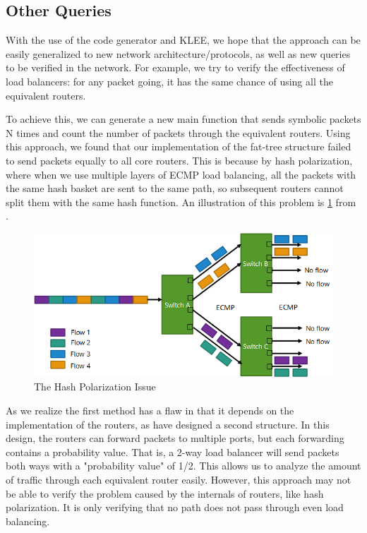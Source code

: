 \documentclass[letterpaper, 10 pt, conference]{ieeeconf}  %
\begin{document}
\subsection{Other Queries}

With the use of the code generator and KLEE, we hope that the approach can be easily generalized to new network architecture/protocols, as well as new queries to be verified in the network. 
For example, we try to verify the effectiveness of load balancers: for any packet going, it has the same chance of using all the equivalent routers. 

To achieve this, we can generate a new main function that sends symbolic packets N times and count the number of packets through the equivalent routers. 
Using this approach, we found that our implementation of the fat-tree structure failed to send packets equally to all core routers. 
This is because by hash polarization, where when we use multiple layers of ECMP load balancing, all the packets with the same hash basket are sent to the same path, so subsequent routers cannot split them with the same hash function. 
An illustration of this problem is \ref{fig:hash_polar} from \cite{huawei-hash}.

\begin{figure}[]
  \centering
  \includegraphics[width=\linewidth]{hash-polar.png}
  \caption{The Hash Polarization Issue}
  \label{fig:hash_polar}
\end{figure}

As we realize the first method has a flaw in that it depends on the implementation of the routers, as have designed a second structure. 
In this design, the routers can forward packets to multiple ports, but each forwarding contains a probability value. 
That is, a 2-way load balancer will send packets both ways with a "probability value" of 1/2. 
This allows us to analyze the amount of traffic through each equivalent router easily. 
However, this approach may not be able to verify the problem caused by the internals of routers, like hash polarization. 
It is only verifying that no path does not pass through even load balancing. 
\end{document}

